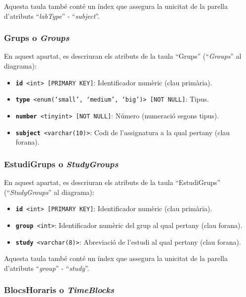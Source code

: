 \documentclass[a4paper,12pt]{ThesisStyle}
\begin{document}
Aquesta taula també conté un índex que assegura la unicitat de la parella d'atributs ``\textit{labType}'' - ``\textit{subject}''.

\subsubsection{Grups o \textit{Groups}}

En aquest apartat, es descriuran els atributs de la taula ``Grups'' (``\textit{Groups}'' al diagrama):
\begin{itemize}
  \item \texttt{\textbf{id} <int> [PRIMARY KEY]}: Identificador numèric (clau primària).
  \item \texttt{\textbf{type} <enum(`small', `medium', `big')> [NOT NULL]}: Tipus.
  \item \texttt{\textbf{number} <tinyint> [NOT NULL]}: Número (numeració segons tipus).
  \item \texttt{\textbf{subject} <varchar(10)>}: Codi de l'assignatura a la qual pertany (clau forana).
\end{itemize}

\subsubsection{EstudiGrups o \textit{StudyGroups}}

En aquest apartat, es descriuran els atributs de la taula ``EstudiGrups'' (``\textit{StudyGroups}'' al diagrama):
\begin{itemize}
  \item \texttt{\textbf{id} <int> [PRIMARY KEY]}: Identificador numèric (clau primària).
  \item \texttt{\textbf{group} <int>}: Identificador numèric del grup al qual pertany (clau forana).
  \item \texttt{\textbf{study} <varchar(8)>}: Abreviació de l'estudi al qual pertany (clau forana).
\end{itemize}

Aquesta taula també conté un índex que assegura la unicitat de la parella d'atributs ``\textit{group}'' - ``\textit{study}''.

\subsubsection{BlocsHoraris o \textit{TimeBlocks}}
\end{document}
